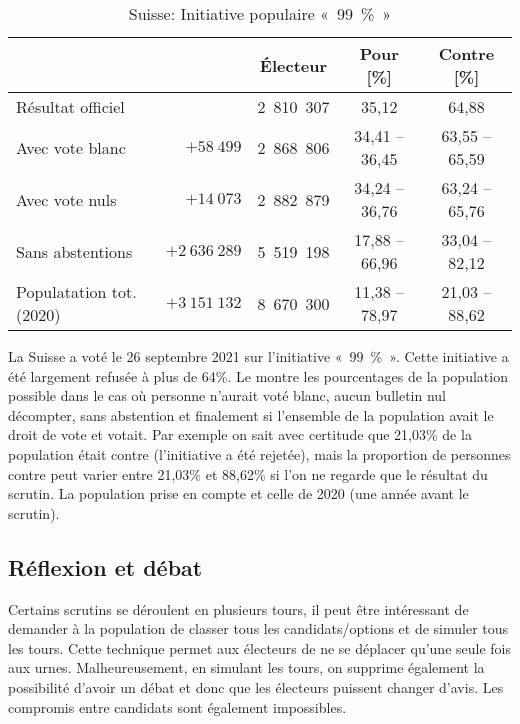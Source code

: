 \documentclass[../report]{subfiles}
\begin{document}
  \begin{table}[h]
    \caption{Suisse: Initiative populaire «~99~\%~»}%
    \label{tab:votation:99pourcent}%
    \begin{center}
      \begin{tabular}{lrccc}
        \hline
        & & Électeur & Pour [\%] & Contre [\%] \\
        \hline
        \hline
        Résultat officiel        &              & 2~810~307 & 35,12          & 64,88          \\
        Avec vote blanc          & $+58~499$    & 2~868~806 & 34,41 -- 36,45 & 63,55 -- 65,59 \\
        Avec vote nuls           & $+14~073$    & 2~882~879 & 34,24 -- 36,76 & 63,24 -- 65,76 \\
        Sans abstentions         & $+2~636~289$ & 5~519~198 & 17,88 -- 66,96 & 33,04 -- 82,12 \\
        Populatation tot. (2020) & $+3~151~132$ & 8~670~300 & 11,38 -- 78,97 & 21,03 -- 88,62 \\
        \hline
      \end{tabular}
    \end{center}
  \end{table}

  La Suisse a voté le 26 septembre 2021 sur l'initiative «~99~\%~».
  Cette initiative a été largement refusée à plus de 64\%.
  Le  montre les pourcentages de la population possible dans le 
  cas où personne n'aurait voté blanc, aucun bulletin nul décompter, sans abstention et 
  finalement si l'ensemble de la population avait le droit de vote et votait.
  Par exemple on sait avec certitude que 21,03\% de la population était contre 
  (l'initiative a été rejetée), mais la proportion de personnes contre peut varier entre 
  21,03\% et 88,62\% si l'on ne regarde que le résultat du scrutin.
  La population prise en compte et celle de 2020 (une année avant le scrutin).

  \subsection{Réflexion et débat}

  Certains scrutins se déroulent en plusieurs tours, il peut être intéressant de demander à la 
  population de classer tous les candidats/options et de simuler tous les tours.
  Cette technique permet aux électeurs de ne se déplacer qu'une seule fois aux urnes.
  Malheureusement, en simulant les tours, on supprime également la possibilité d'avoir un
  débat et donc que les électeurs puissent changer d'avis.
  Les compromis entre candidats sont également impossibles.
\end{document}

